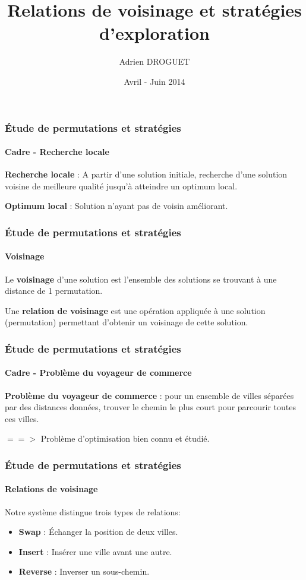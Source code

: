 \documentclass{beamer}
\title{Relations de voisinage et stratégies d'exploration}
\author{Adrien DROGUET}
\date{Avril - Juin 2014}
\begin{document}
\frame{\titlepage}


\begin{frame}
  \frametitle{Étude de permutations et stratégies}
  \framesubtitle{Cadre - Recherche locale}

  \begin{definition}
    \textbf{Recherche locale} : A partir d'une solution initiale, recherche
d'une solution voisine de meilleure qualité jusqu'à atteindre un optimum local.
  \end{definition}

  \begin{definition}
    \textbf{Optimum local} : Solution n'ayant pas de voisin améliorant.
  \end{definition}

\end{frame}


\begin{frame}
  \frametitle{Étude de permutations et stratégies}
  \framesubtitle{Voisinage}
  
  \begin{definition}
    Le \textbf{voisinage} d'une solution est l'ensemble des solutions se
trouvant à une distance de 1 permutation.
  \end{definition}

  \begin{definition}
    Une \textbf{relation de voisinage} est une opération appliquée à une
solution (permutation) permettant d'obtenir un voisinage de cette solution.
  \end{definition}
\end{frame}

\begin{frame}
  \frametitle{Étude de permutations et stratégies}
  \framesubtitle{Cadre - Problème du voyageur de commerce}
  \begin{definition}
    \textbf{Problème du voyageur de commerce} : pour un ensemble de villes
séparées par des distances données, trouver le chemin le plus court pour
parcourir toutes ces villes.
  \end{definition}
  $==>$ Problème d'optimisation bien connu et étudié.
  
\end{frame}

\begin{frame}
  \frametitle{Étude de permutations et stratégies}
  \framesubtitle{Relations de voisinage}
  
  Notre système distingue trois types de relations:
  \begin{itemize}
   \item \textbf{Swap} : Échanger la position de deux villes.
   \item \textbf{Insert} : Insérer une ville avant une autre.
   \item \textbf{Reverse} : Inverser un sous-chemin.
  \end{itemize}

\end{frame}
\end{document}
